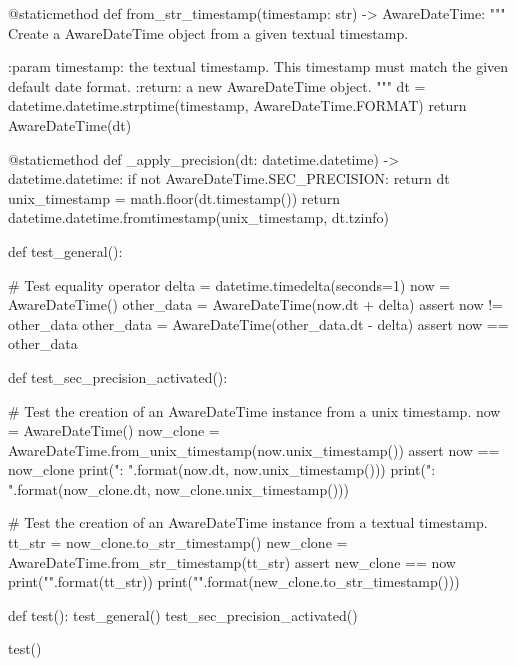 \documentclass{article}
\begin{document}
\begin{python}
    @staticmethod
    def from_str_timestamp(timestamp: str) -> AwareDateTime:
        """
        Create a AwareDateTime object from a given textual timestamp.

        :param timestamp: the textual timestamp. This timestamp must match the given default date format.
        :return: a new AwareDateTime object.
        """
        dt = datetime.datetime.strptime(timestamp, AwareDateTime.FORMAT)
        return AwareDateTime(dt)

    @staticmethod
    def _apply_precision(dt: datetime.datetime) -> datetime.datetime:
        if not AwareDateTime.SEC_PRECISION:
            return dt
        unix_timestamp = math.floor(dt.timestamp())
        return datetime.datetime.fromtimestamp(unix_timestamp, dt.tzinfo)


def test_general():

    # Test equality operator
    delta = datetime.timedelta(seconds=1)
    now = AwareDateTime()
    other_data = AwareDateTime(now.dt + delta)
    assert now != other_data
    other_data = AwareDateTime(other_data.dt - delta)
    assert now == other_data


def test_sec_precision_activated():

    # Test the creation of an AwareDateTime instance from a unix timestamp.
    now = AwareDateTime()
    now_clone = AwareDateTime.from_unix_timestamp(now.unix_timestamp())
    assert now == now_clone
    print("{}: {}".format(now.dt, now.unix_timestamp()))
    print("{}: {}".format(now_clone.dt, now_clone.unix_timestamp()))

    # Test the creation of an AwareDateTime instance from a textual timestamp.
    tt_str = now_clone.to_str_timestamp()
    new_clone = AwareDateTime.from_str_timestamp(tt_str)
    assert new_clone == now
    print("{}".format(tt_str))
    print("{}".format(new_clone.to_str_timestamp()))


def test():
    test_general()
    test_sec_precision_activated()


test()
    \end{python}
\end{document}
